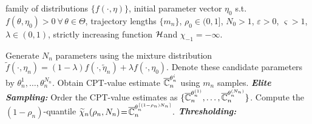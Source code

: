 \begin{algorithm}
\begin{algorithmic}
  family of distributions $\{f(\cdot,\eta)\}$, initial parameter vector $\eta_0$ s.t. $f(\theta,\eta_0)>0 ~\forall\, \theta\in \Theta$, trajectory lengths $\{m_n\}$, 
$\rho_0 \in (0,1]$, $N_0>1$,
$\varepsilon> 0$, $\varsigma>1$, $\lambda \in(0,1)$,
strictly increasing function
$\mathcal{H}\hspace*{-3pt}$ and $\chi_{-1}=-\infty$.

	    \State 
	    Generate $N_n$ parameters using the mixture distribution $\widetilde f(\cdot,\eta_n)= (1-\lambda)f(\cdot,\widetilde\eta_n)+\lambda f(\cdot,\eta_0)$. 
	    \State Denote these candidate parameters by $\theta^1_n, \ldots, \theta_n^{N_n}$.
	      \State Obtain CPT-value estimate $\overline {\mathbb{C}}_n^{\theta^i_n}$  using $m_n$ samples.
	      \EndFor
	  \State \textbf{\textit{Elite Sampling:}}
	  \State Order the CPT-value estimates as $\{\overline {\mathbb{C}}_n^{\theta^{(1)}_n},\ldots,\overline {\mathbb{C}}_n^{\theta^{(N_n)}_n}\}$. 
	  \State Compute the $(1-\rho_n)$-quantile $
\widetilde \chi_{n}(\rho_n,N_n) \!=\! \overline {\mathbb{C}}_n^{\theta^{\lceil(1-\rho_n)N_n \rceil}_n}.$
		  \State \textbf{\textit{Thresholding:}}
	

\end{algorithmic}
\end{algorithm}
